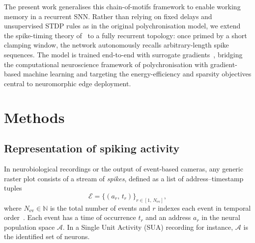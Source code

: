 \documentclass{article}
\begin{document}
The present work generalises this chain-of-motifs framework to enable working memory in a recurrent SNN. Rather than relying on fixed delays and unsupervised STDP rules as in the original polychronisation model, we extend the spike-timing theory of~\citep{Kronland-Martinet2025} to a fully recurrent topology: once primed by a short clamping window, the network autonomously recalls arbitrary-length spike sequences. The model is trained end-to-end with surrogate gradients~\citep{Neftci2019a}, bridging the computational neuroscience framework of polychronisation with gradient-based machine learning and targeting the energy-efficiency and sparsity objectives central to neuromorphic edge deployment.

\section{Methods}
\label{sec:methods}

\subsection{Representation of spiking activity}

In neurobiological recordings or the output of event-based cameras, any generic raster plot consists of a stream of \emph{spikes}, defined as a list of address--timestamp tuples
\[
  \mathcal{E}
  = \bigl\{(a_r,\, t_r)\bigr\}_{r \in [1,\, N_\mathrm{ev}]},
\]
where $N_\mathrm{ev} \in \mathbb{N}$ is the total number of events and $r$ indexes each event in temporal order~\citep{Grimaldi2024}. Each event has a time of occurrence $t_r$ and an address $a_r$ in the neural population space $\mathcal{A}$. In a Single Unit Activity (SUA) recording for instance, $\mathcal{A}$ is the identified set of neurons.
\end{document}

